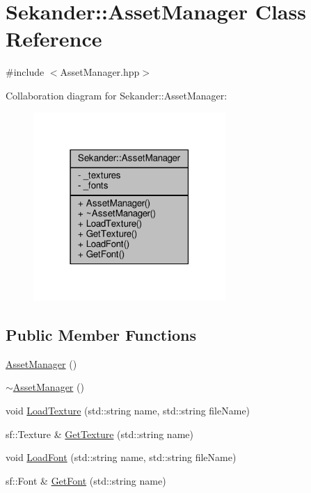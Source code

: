 \hypertarget{classSekander_1_1AssetManager}{}\section{Sekander\+:\+:Asset\+Manager Class Reference}
\label{classSekander_1_1AssetManager}


{\ttfamily \#include $<$Asset\+Manager.\+hpp$>$}



Collaboration diagram for Sekander\+:\+:Asset\+Manager\+:
\nopagebreak
\begin{figure}[H]
\begin{center}
\leavevmode
\includegraphics[width=207pt]{classSekander_1_1AssetManager__coll__graph}
\end{center}
\end{figure}
\subsection*{Public Member Functions}
\begin{DoxyCompactItemize}
\item 
\hyperlink{classSekander_1_1AssetManager_a5d122bc31351cdf6a844d97351243b1b}{Asset\+Manager} ()
\item 
\hyperlink{classSekander_1_1AssetManager_a471be342805da815a3de41b72ed6a763}{$\sim$\+Asset\+Manager} ()
\item 
void \hyperlink{classSekander_1_1AssetManager_a49871c9808fc5e2988059c92fb181c67}{Load\+Texture} (std\+::string name, std\+::string file\+Name)
\item 
sf\+::\+Texture \& \hyperlink{classSekander_1_1AssetManager_a276ceaa15497655f3ecf24d1b74b5122}{Get\+Texture} (std\+::string name)
\item 
void \hyperlink{classSekander_1_1AssetManager_adec8c37238ad13c8756c13ed845150e3}{Load\+Font} (std\+::string name, std\+::string file\+Name)
\item 
sf\+::\+Font \& \hyperlink{classSekander_1_1AssetManager_a745b3164696e8a92fb479119d11ac034}{Get\+Font} (std\+::string name)
\end{DoxyCompactItemize}
